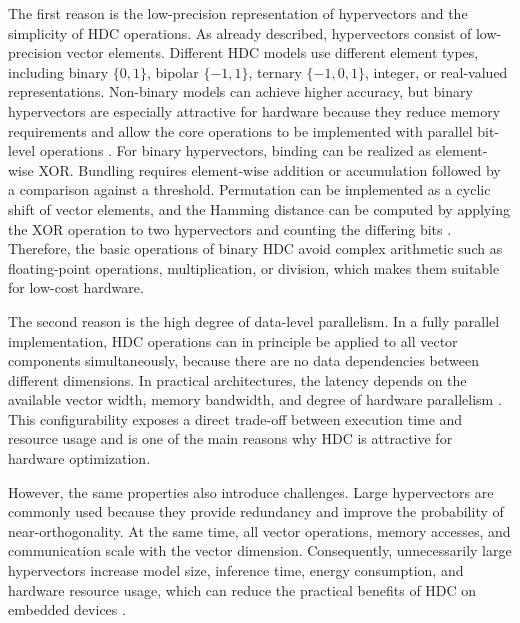    The first reason is the low-precision representation of hypervectors and the simplicity of HDC operations. As already described, hypervectors consist of low-precision vector elements. Different HDC models use different element types, including binary $\{0,1\}$, bipolar $\{-1,1\}$, ternary $\{-1,0,1\}$, integer, or real-valued representations. Non-binary models can achieve higher accuracy, but binary hypervectors are especially attractive for hardware because they reduce memory requirements and allow the core operations to be implemented with parallel bit-level operations \cite{thomas_theoretical_2021,ge_classification_2020,martino_configurable_2026}. 
    For binary hypervectors, binding can be realized as element-wise XOR. Bundling requires element-wise addition or accumulation followed by a comparison against a threshold. Permutation can be implemented as a cyclic shift of vector elements, and the Hamming distance can be computed by applying the XOR operation to two hypervectors and counting the differing bits \cite{hassan_hyper-dimensional_2022}. Therefore, the basic operations of binary HDC avoid complex arithmetic such as floating-point operations, multiplication, or division, which makes them suitable for low-cost hardware.
    
    The second reason is the high degree of data-level parallelism. In a fully parallel implementation, HDC operations can in principle be applied to all vector components simultaneously, because there are no data dependencies between different dimensions. In practical architectures, the latency depends on the available vector width, memory bandwidth, and degree of hardware parallelism \cite{martino_configurable_2026}.
    This configurability exposes a direct trade-off between execution time and resource usage and is one of the main reasons why HDC is attractive for hardware optimization.

    However, the same properties also introduce challenges. Large hypervectors are commonly used because they provide redundancy and improve the probability of near-orthogonality. At the same time, all vector operations, memory accesses, and communication scale with the vector dimension. Consequently, unnecessarily large hypervectors increase model size, inference time, energy consumption, and hardware resource usage, which can reduce the practical benefits of HDC on embedded devices \cite{basaklar_hypervector_2021}.\\
    
